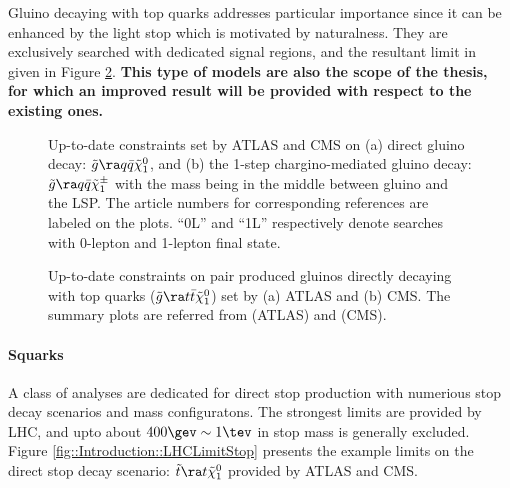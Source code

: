Gluino decaying with top quarks addresses particular importance since it can be enhanced by the light stop which is motivated by naturalness. 
They are exclusively searched with dedicated signal regions, and the resultant limit in given in Figure \ref{fig::Introduction::LHCLimitGtt}. 
\textbf{This type of models are also the scope of the thesis, for which an improved result will be provided with respect to the existing ones.}

\clearpage
\begin{figure}
  \centering
    \caption{Up-to-date constraints set by ATLAS and CMS on (a) direct gluino decay: $\tg \ra q \bar{q} \tLSP$, and (b) the 1-step chargino-mediated gluino decay: $\tg \ra q\bar{q} \tchic$ with the mass being in the middle between gluino and the LSP. The article numbers for corresponding references are labeled on the plots. ``0L'' and ``1L'' respectively denote searches with 0-lepton and 1-lepton final state.}
    \label{fig::Introduction::LHCLimitGG}
\end{figure}
%
\begin{figure}
  \centering
    \caption{Up-to-date constraints on pair produced gluinos directly decaying with top quarks ($\tg \ra t\bar{t} \tLSP$) set by (a) ATLAS and (b) CMS.
    The summary plots are referred from \cite{ATLAS_SUSY_PublicResult} (ATLAS) and \cite{CMS_SUSY_PubResult} (CMS). 
    }
    \label{fig::Introduction::LHCLimitGtt}
\end{figure}

\clearpage
\paragraph{Squarks}
A class of analyses are dedicated for direct stop production with numerious stop decay scenarios and mass configuratons.
The strongest limits are provided by LHC, and upto about $400\gev \sim 1\tev$ in stop mass is generally excluded. Figure \ref{fig::Introduction::LHCLimitStop} presents the example limits on the direct stop decay scenario: $\ttop \ra t \tilde{\chi}_1^0$ provided by ATLAS and CMS.

